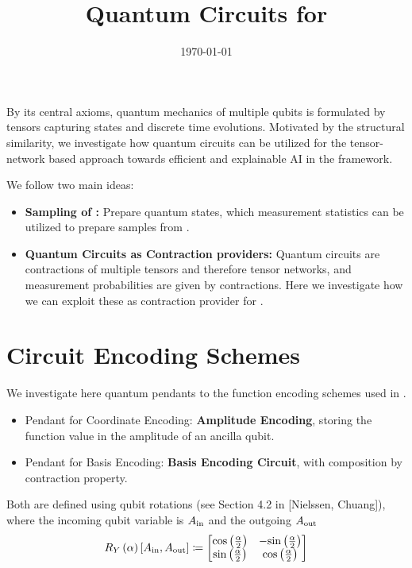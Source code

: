 \documentclass[aps,onecolumn,nofootinbib,pra]{article}
\begin{document}
    \title{Quantum Circuits for \tnreason{}}

    \maketitle
    \date{\today}

    By its central axioms, quantum mechanics of multiple qubits is formulated by tensors capturing states and discrete time evolutions.
    Motivated by the structural similarity, we investigate how quantum circuits can be utilized for the tensor-network based approach towards efficient and explainable AI in the \tnreason{} framework.

    We follow two main ideas:
    \begin{itemize}
        \item \textbf{Sampling of \ComputationActivationNetworks{}:} Prepare quantum states, which measurement statistics can be utilized to prepare samples from \ComputationActivationNetworks{}.
        \item \textbf{Quantum Circuits as Contraction providers:} Quantum circuits are contractions of multiple tensors and therefore tensor networks, and measurement probabilities are given by contractions.
        Here we investigate how we can exploit these as contraction provider for \tnreason{}.
    \end{itemize}

    \tableofcontents


    \section{Circuit Encoding Schemes}

    We investigate here quantum pendants to the function encoding schemes used in \tnreason{}{}.

    \begin{itemize}
        \item Pendant for Coordinate Encoding: \textbf{Amplitude Encoding}, storing the function value in the amplitude of an ancilla qubit.
        \item Pendant for Basis Encoding: \textbf{Basis Encoding Circuit}, with composition by contraction property.
    \end{itemize}

    Both are defined using qubit rotations (see Section 4.2 in [Nielssen, Chuang]), where the incoming qubit variable is $A_{\mathrm{in}}$ and the outgoing $A_{\mathrm{out}}$
    \begin{align*}
        R_Y\left({\alpha}\right)\left[A_{\mathrm{in}},A_{\mathrm{out}}\right] \coloneqq
        \begin{bmatrix}
            \mathrm{cos}\left(\frac{\alpha}{2}\right) & -\mathrm{sin}\left(\frac{\alpha}{2}\right) \\
            \mathrm{sin}\left(\frac{\alpha}{2}\right) & \mathrm{cos}\left(\frac{\alpha}{2}\right)
        \end{bmatrix}
    \end{align*}
\end{document}
